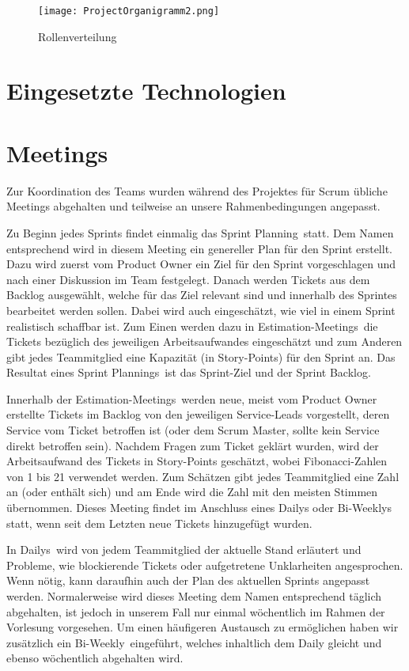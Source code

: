     \begin{figure}[!hbt]
        \texttt{[image: ProjectOrganigramm2.png]}
        \caption{Rollenverteilung}
        \label{fig:Rollenverteilung}
    \end{figure}
    
\section{Eingesetzte Technologien}

\section{Meetings}
    Zur Koordination des Teams wurden während des Projektes für Scrum übliche Meetings abgehalten und teilweise an unsere Rahmenbedingungen angepasst.

    Zu Beginn jedes Sprints findet einmalig das \glqq Sprint Planning\grqq~statt. Dem Namen entsprechend wird in diesem Meeting ein genereller Plan 
    für den Sprint erstellt. Dazu wird zuerst vom Product Owner ein Ziel für den Sprint vorgeschlagen und nach einer Diskussion im Team festgelegt.
    Danach werden Tickets aus dem Backlog ausgewählt, welche für das Ziel relevant sind und innerhalb des Sprintes bearbeitet werden sollen. Dabei 
    wird auch eingeschätzt, wie viel in einem Sprint realistisch schaffbar ist. Zum Einen werden dazu in \glqq Estimation-Meetings\grqq~die Tickets
    bezüglich des jeweiligen Arbeitsaufwandes eingeschätzt und zum Anderen gibt jedes Teammitglied eine Kapazität (in Story-Points) für den Sprint an.
    Das Resultat eines \glqq Sprint Plannings\grqq~ist das Sprint-Ziel und der Sprint Backlog.

    Innerhalb der \glqq Estimation-Meetings\grqq~werden neue, meist vom Product Owner erstellte Tickets im Backlog von den jeweiligen Service-Leads
    vorgestellt, deren Service vom Ticket betroffen ist (oder dem Scrum Master, sollte kein Service direkt betroffen sein). Nachdem Fragen zum Ticket
    geklärt wurden, wird der Arbeitsaufwand des Tickets in Story-Points geschätzt, wobei Fibonacci-Zahlen von 1 bis 21 verwendet werden. Zum Schätzen
    gibt jedes Teammitglied eine Zahl an (oder enthält sich) und am Ende wird die Zahl mit den meisten Stimmen übernommen. 
    Dieses Meeting findet im Anschluss eines Dailys oder Bi-Weeklys statt, wenn seit dem Letzten neue Tickets hinzugefügt wurden.

    In \glqq Dailys\grqq~wird von jedem Teammitglied der aktuelle Stand erläutert und Probleme, wie blockierende Tickets oder aufgetretene 
    Unklarheiten angesprochen. Wenn nötig, kann daraufhin auch der Plan des aktuellen Sprints angepasst werden. Normalerweise wird dieses Meeting 
    dem Namen entsprechend täglich abgehalten, ist jedoch in unserem Fall nur einmal wöchentlich im Rahmen der Vorlesung vorgesehen. Um einen 
    häufigeren Austausch zu ermöglichen haben wir zusätzlich ein \glqq Bi-Weekly\grqq~eingeführt, welches inhaltlich dem Daily gleicht und ebenso 
    wöchentlich abgehalten wird.

